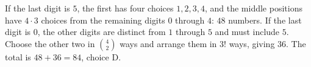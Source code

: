 If the last digit is $5$, the first has four choices $1,2,3,4$, and the middle positions have $4\cdot3$ choices from the remaining digits $0$ through $4$: $48$ numbers. If the last digit is $0$, the other digits are distinct from $1$ through $5$ and must include $5$. Choose the other two in $\binom{4}{2}$ ways and arrange them in $3!$ ways, giving $36$. The total is $48+36=\boxed{84}$, choice D.
